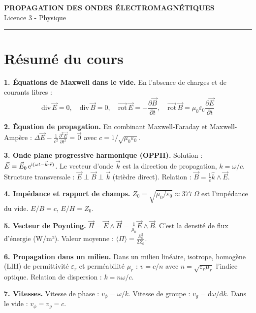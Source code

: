 \documentclass[12pt,a4paper]{article}
\begin{document}
\fi

\begin{center}
  {\LARGE\bfseries PROPAGATION DES ONDES ÉLECTROMAGNÉTIQUES}\\[0.3cm]
  {\normalsize Licence 3 - Physique}\\[0.1cm]
  \rule{0.7\textwidth}{0.8pt}
\end{center}

\section*{Résumé du cours}

\begin{boiteresume}

\textbf{1. Équations de Maxwell dans le vide.} En l'absence de charges et de courants libres :
\[
\mathrm{div}\,\vec{E}=0,\quad \mathrm{div}\,\vec{B}=0,\quad \overrightarrow{\mathrm{rot}}\,\vec{E}=-\frac{\partial\vec{B}}{\partial t},\quad \overrightarrow{\mathrm{rot}}\,\vec{B}=\mu_0\varepsilon_0\frac{\partial\vec{E}}{\partial t}
\]

\textbf{2. Équation de propagation.} En combinant Maxwell-Faraday et Maxwell-Ampère : $\Delta\vec{E}-\frac{1}{c^2}\frac{\partial^2\vec{E}}{\partial t^2}=\vec{0}$ avec $c=1/\sqrt{\mu_0\varepsilon_0}$.

\textbf{3. Onde plane progressive harmonique (OPPH).} Solution : $\vec{E} = \vec{E}_0\,\mathrm{e}^{\mathrm{i}(\omega t - \vec{k}\cdot\vec{r})}$. Le vecteur d'onde $\vec{k}$ est la direction de propagation, $k = \omega/c$. Structure transversale : $\vec{E}\perp\vec{B}\perp\vec{k}$ (trièdre direct). Relation : $\vec{B} = \frac{1}{c}\hat{k}\wedge\vec{E}$.

\textbf{4. Impédance et rapport de champs.} $Z_0 = \sqrt{\mu_0/\varepsilon_0} \approx \qty{377}{\Omega}$ est l'impédance du vide. $E/B = c$, $E/H = Z_0$.

\textbf{5. Vecteur de Poynting.} $\vec{\Pi} = \vec{E}\wedge\vec{H} = \frac{1}{\mu_0}\vec{E}\wedge\vec{B}$. C'est la densité de flux d'énergie (W/m²). Valeur moyenne : $\langle\Pi\rangle = \frac{E_0^2}{2Z_0}$.

\textbf{6. Propagation dans un milieu.} Dans un milieu linéaire, isotrope, homogène (LIH) de permittivité $\varepsilon_r$ et perméabilité $\mu_r$ : $v = c/n$ avec $n=\sqrt{\varepsilon_r\mu_r}$ l'indice optique. Relation de dispersion : $k = n\omega/c$.

\textbf{7. Vitesses.} Vitesse de phase : $v_\phi = \omega/k$. Vitesse de groupe : $v_g = \mathrm{d}\omega/\mathrm{d}k$. Dans le vide : $v_\phi = v_g = c$.

\end{boiteresume}
\end{document}
